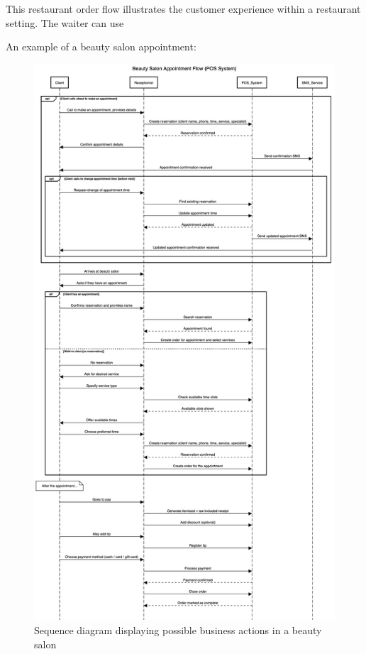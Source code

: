 \documentclass[11pt,a4paper,pdftex]{article}
\begin{document}
This restaurant order flow illustrates the customer experience within a restaurant setting. The waiter can use 

An example of a beauty salon appointment:

\begin{figure}[H]
    \centering
    \includegraphics[scale=0.22]{graphics/beauty salon.png}
    \caption{Sequence diagram displaying possible business actions in a beauty salon}
    \label{figures:sequence_beauty_salon}
\end{figure}
\end{document}
